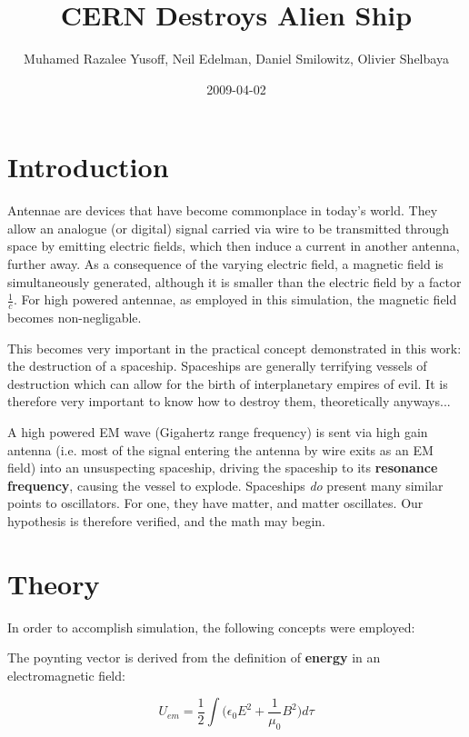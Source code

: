 \documentclass[twocolumn]{article}
\author{Muhamed Razalee Yusoff, Neil Edelman, Daniel Smilowitz, Olivier Shelbaya}
\title{CERN Destroys Alien Ship}
\date{2009-04-02}
\begin{document}
\maketitle

\section{Introduction}
Antennae are devices that have become commonplace in today's world. They allow an analogue (or digital) signal carried
via wire to be transmitted through space by emitting electric fields, which then induce a current in another antenna,
further away. As a consequence of the varying electric field, a magnetic field is simultaneously generated, although
it is smaller than the electric field by a factor $\frac{1}{c}$. For high powered antennae, as employed in this simulation,
the magnetic field becomes non-negligable.
\par

\noindent This becomes very important in the practical concept demonstrated in this work: the destruction of a spaceship. Spaceships
are generally terrifying vessels of destruction which can allow for the birth of interplanetary empires of evil. It is
therefore very important to know how to destroy them, theoretically anyways...
\par

A high powered EM wave (Gigahertz range frequency) is sent via high gain antenna (i.e. most of the signal entering the antenna by wire exits as an EM 
field) into an unsuspecting spaceship, driving the spaceship to its \textbf{resonance frequency},
causing the vessel to explode. Spaceships \textit{do} present many similar points to oscillators. For one, they have matter,
and matter oscillates. Our hypothesis is therefore verified, and the math may begin.

\section{Theory}
\noindent In order to accomplish simulation, the following concepts were employed:

\noindent The poynting vector is derived from the definition of \textbf{energy} in an electromagnetic
field:

\begin{equation}
U_{em} = \frac{1}{2}\int \Bigg( \epsilon_{0}E^{2} + \frac{1}{\mu_{0}}B^{2} \Bigg) d\tau
\end{equation}
\end{document}
